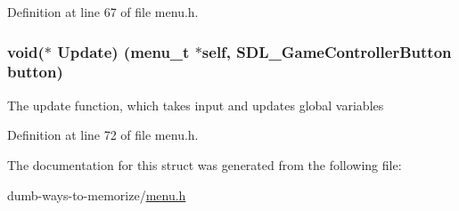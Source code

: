 Definition at line 67 of file menu.\+h.

\subsubsection[{\texorpdfstring{Update}{Update}}]{\setlength{\rightskip}{0pt plus 5cm}void($\ast$ Update) ({\bf menu\+\_\+t} $\ast$self, S\+D\+L\+\_\+\+Game\+Controller\+Button button)}\hypertarget{structmenu__s_afdc00f47a596fec9f5362aeab002e868}{}\label{structmenu__s_afdc00f47a596fec9f5362aeab002e868}
The update function, which takes input and updates global variables 

Definition at line 72 of file menu.\+h.



The documentation for this struct was generated from the following file\+:\begin{DoxyCompactItemize}
\item 
dumb-\/ways-\/to-\/memorize/\hyperlink{menu_8h}{menu.\+h}\end{DoxyCompactItemize}
